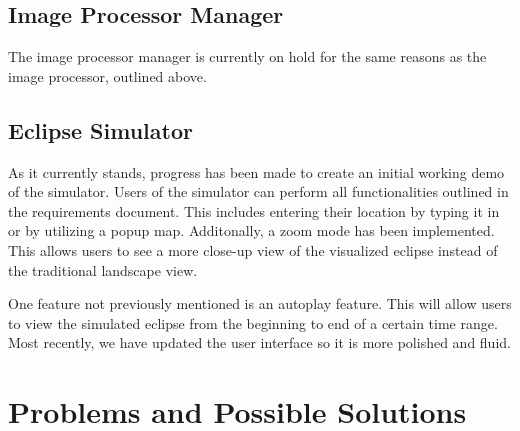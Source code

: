 \documentclass[10pt, onecolumn, draftclsnofoot, letterpaper, compsoc]{IEEEtran}
\begin{document}
\subsection{Image Processor Manager}

The image processor manager is currently on hold for the same reasons as the image processor,
outlined above.

\subsection{Eclipse Simulator}

As it currently stands, progress has been made to create an initial working
demo of the simulator. Users of the simulator can perform all functionalities
outlined in the requirements document. This includes entering their location by
typing it in or by utilizing a popup map. Additonally, a zoom mode has been
implemented. This allows users to see a more close-up view of the visualized
eclipse instead of the traditional landscape view.

One feature not previously mentioned is an autoplay feature. This will allow
users to view the simulated eclipse from the beginning to end of a certain
time range. Most recently, we have updated the user interface so it is more
polished and fluid.

\section{Problems and Possible Solutions}
\end{document}
